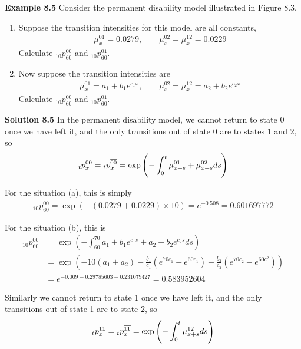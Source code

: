 \documentclass[hidelinks, 12pt]{article}
\theoremstyle{mydefstyle}
\theoremstyle{mythmstyle}
\begin{document}
\textbf{Example 8.5} Consider the permanent disability model illustrated in Figure 8.3. 
\begin{enumerate}[label=(\alph*)]
\item Suppose the transition intensities for this model are all constants,
\begin{gather*}
\mu_x^{01} = 0.0279, \qquad \mu_x^{02} = \mu_x^{12} = 0.0229
\end{gather*}
Calculate $_{10}p_{60}^{00}$ and $_{10}p_{60}^{01}$.
\item Now suppose the transition intensities are
\begin{gather*}
\mu_x^{01} = a_1 + b_1 e^{c_1 x}, \qquad \mu_x^{02} = \mu_x^{12} = a_2 + b_2 e^{c_2 x}
\end{gather*}
Calculate $_{10}p_{60}^{00}$ and $_{10}p_{60}^{01}$.
\end{enumerate}

\textbf{Solution 8.5} In the permanent disability model, we cannot return to state 0 once we have left it, and the only transitions out of state 0 are to states 1 and 2, so 
\begin{gather*}
_tp_x^{00} = \hspace{0mm}_tp_x^{\overline{00}} = \exp \left( - \int_0^t \mu_{x+s}^{01} + \mu_{x+s}^{02} ds \right)
\end{gather*}

For the situation (a), this is simply
\begin{gather*}
_{10}p_{60}^{00} = \exp \left( - (0.0279 + 0.0229) \times 10 \right) = e^{-0.508} = 0.601697772
\end{gather*}

For the situation (b), this is
\begin{align*}
_{10}p_{60}^{00} 
&= \exp \left( - \int_{60}^{70} a_1 + b_1 e^{c_1 s} + a_2 + b_2 e^{c_2 s} ds \right) \\
&= \exp \left( - 10 (a_1 + a_2) - \frac{b_1}{c_1} \left( e^{70c_1} - e^{60c_1} \right) - \frac{b_2}{c_2} \left( e^{70c_2} - e^{60c^2} \right) \right)
\\
&= e^{-0.009 - 0.29785603 - 0.231079427} = 0.583952604
\end{align*}

Similarly we cannot return to state 1 once we have left it, and the only transitions out of state 1 are to state 2, so
\begin{gather*}
_tp_x^{11} = \hspace{0mm}_tp_x^{\overline{11}} = \exp \left( - \int_0^t \mu_{x+s}^{12} ds \right)
\end{gather*}
\end{document}
